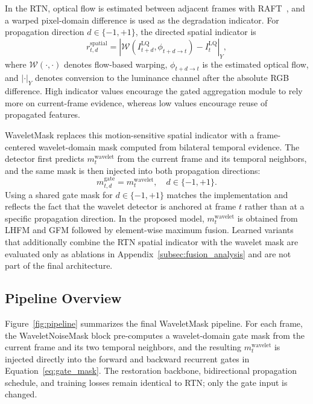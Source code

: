 \documentclass[applsci,article,submit,pdftex,moreauthors]{Definitions/mdpi}
\begin{document}
In the RTN, optical flow is estimated between adjacent frames with RAFT~\cite{teed2020raft}, and a warped pixel-domain difference is used as the degradation indicator. For propagation direction $d\in\{-1,+1\}$, the directed spatial indicator is
\begin{equation}\label{eq:baseline_indicator}
    r_{t,d}^{\mathrm{spatial}} = \left|\mathcal{W}\!\left(I_{t+d}^{\mathrm{LQ}},\phi_{t+d\to t}\right)-I_t^{\mathrm{LQ}}\right|_{Y},
\end{equation}
where $\mathcal{W}(\cdot,\cdot)$ denotes flow-based warping, $\phi_{t+d\to t}$ is the estimated optical flow, and $|\cdot|_{Y}$ denotes conversion to the luminance channel after the absolute RGB difference. High indicator values encourage the gated aggregation module to rely more on current-frame evidence, whereas low values encourage reuse of propagated features.

WaveletMask replaces this motion-sensitive spatial indicator with a frame-centered wavelet-domain mask computed from bilateral temporal evidence. The detector first predicts $m_t^{\mathrm{wavelet}}$ from the current frame and its temporal neighbors, and the same mask is then injected into both propagation directions:
\begin{equation}\label{eq:gate_mask}
    m_{t,d}^{\mathrm{gate}} = m_t^{\mathrm{wavelet}}, \quad d\in\{-1,+1\}.
\end{equation}
Using a shared gate mask for $d\in\{-1,+1\}$ matches the implementation and reflects the fact that the wavelet detector is anchored at frame $t$ rather than at a specific propagation direction. In the proposed model, $m_t^{\mathrm{wavelet}}$ is obtained from LHFM and GFM followed by element-wise maximum fusion. Learned variants that additionally combine the RTN spatial indicator with the wavelet mask are evaluated only as ablations in Appendix~\ref{subsec:fusion_analysis} and are not part of the final architecture.

\subsection{Pipeline Overview}\label{subsec:overview}

Figure~\ref{fig:pipeline} summarizes the final WaveletMask pipeline. For each frame, the WaveletNoiseMask block pre-computes a wavelet-domain gate mask from the current frame and its two temporal neighbors, and the resulting $m_t^{\mathrm{wavelet}}$ is injected directly into the forward and backward recurrent gates in Equation~\eqref{eq:gate_mask}. The restoration backbone, bidirectional propagation schedule, and training losses remain identical to RTN; only the gate input is changed.
\end{document}
